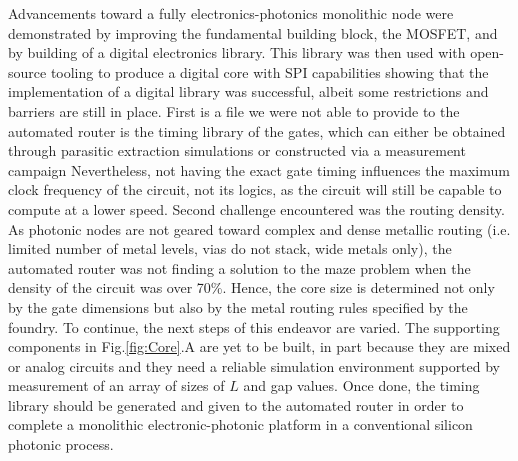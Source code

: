 Advancements toward a fully electronics-photonics monolithic node were demonstrated by improving the fundamental building block, the MOSFET, and by building of a digital electronics library. 
This library was then used with open-source tooling to produce a digital core with SPI capabilities showing that the implementation of a digital library was successful, albeit some restrictions and barriers are still in place.
First is a file we were not able to provide to the automated router is the timing library of the gates, which can either be obtained through parasitic extraction simulations or constructed via a measurement campaign
Nevertheless, not having the exact gate timing influences the maximum clock frequency of the circuit, not its logics, as the circuit will still be capable to compute at a lower speed. 
Second challenge encountered was the routing density. 
As photonic nodes are not geared toward complex and dense metallic routing (i.e. limited number of metal levels, vias do not stack, wide metals only), the automated router was not finding a solution to the maze problem when the density of the circuit was over 70\%. 
Hence, the core size is determined not only by the gate dimensions but also by the metal routing rules specified by the foundry.
To continue, the next steps of this endeavor are varied.
The supporting components in Fig.\ref{fig:Core}.A are yet to be built, in part because they are mixed or analog circuits and they need a reliable simulation environment supported by measurement of an array of sizes of $L$ and gap values.
Once done, the timing library should be generated and given to the automated router in order to complete a monolithic electronic-photonic platform in a conventional silicon photonic process. 
\vspace{-5pt}



